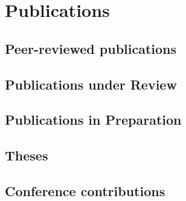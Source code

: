 
\ifacademic

    \section{Publications}

        \subsection{Peer-reviewed publications}
        \begin{refsection}
            \nocite{
                Breinl2017,
                GironsLopez2017,
                GironsLopez2017a,
                GironsLopez2016a,
                Mbanguka2016,
                GironsLopez2015
            }
            \printbibliography[heading=none]
        \end{refsection}

        \subsection{Publications under Review}
        \begin{refsection}
            \nocite{}
            \printbibliography[heading=none]
        \end{refsection}

        \subsection{Publications in Preparation}
        \begin{refsection}
            \nocite{
                Rivera2017,
                Rivera2017a
            }
            \printbibliography[heading=none]
        \end{refsection}

        \subsection{Theses}
        \begin{refsection}
            \nocite{
                GironsLopez2016,
                GironsLopez2011
            }
            \printbibliography[heading=none]
        \end{refsection}

        \subsection{Conference contributions}
        \begin{refsection}
            \nocite{
                Breinl2017a,
                GironsLopez2017b,
                GironsLopez2017c,
                GironsLopez2016b,
                GironsLopez2016c,
                Rivera2016,
                Rivera2015,
                GironsLopez2013,
                Mbanguka2013
            }
            \printbibliography[heading=none]
        \end{refsection}

